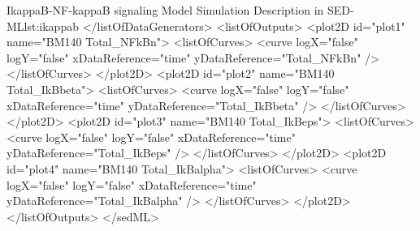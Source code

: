 \begin{myXmlLst}{IkappaB-NF-kappaB signaling Model Simulation Description in SED-ML}{lst:ikappab}
  </listOfDataGenerators>
  <listOfOutputs>
    <plot2D id="plot1" name="BM140 Total_NFkBn">
      <listOfCurves>
        <curve logX="false" logY="false" xDataReference="time" 
        yDataReference="Total_NFkBn" />
      </listOfCurves>
    </plot2D>
    <plot2D id="plot2" name="BM140 Total_IkBbeta">
      <listOfCurves>
        <curve logX="false" logY="false" xDataReference="time"
        yDataReference="Total_IkBbeta" />
      </listOfCurves>
    </plot2D>
    <plot2D id="plot3" name="BM140 Total_IkBeps">
      <listOfCurves>
        <curve logX="false" logY="false" xDataReference="time"
        yDataReference="Total_IkBeps" />
      </listOfCurves>
    </plot2D>
    <plot2D id="plot4" name="BM140 Total_IkBalpha">
      <listOfCurves>
        <curve logX="false" logY="false" xDataReference="time" 
        yDataReference="Total_IkBalpha" />
      </listOfCurves>
    </plot2D>
  </listOfOutputs>
</sedML>
\end{myXmlLst}



